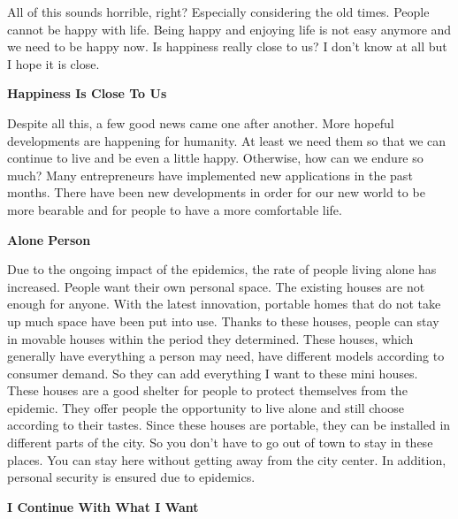 \documentclass[]{book}
\begin{document}
All of this sounds horrible, right? Especially considering the old times. People cannot be happy with life. Being happy and enjoying life is not easy anymore and we need to be happy now. Is happiness really close to us? I don't know at all but I hope it is close.

\textbf{Happiness Is Close To Us}

Despite all this, a few good news came one after another. More hopeful developments are happening for humanity. At least we need them so that we can continue to live and be even a little happy. Otherwise, how can we endure so much? Many entrepreneurs have implemented new applications in the past months. There have been new developments in order for our new world to be more bearable and for people to have a more comfortable life.

\textbf{Alone Person}

Due to the ongoing impact of the epidemics, the rate of people living alone has increased. People want their own personal space. The existing houses are not enough for anyone. With the latest innovation, portable homes that do not take up much space have been put into use. Thanks to these houses, people can stay in movable houses within the period they determined. These houses, which generally have everything a person may need, have different models according to consumer demand. So they can add everything I want to these mini houses. These houses are a good shelter for people to protect themselves from the epidemic. They offer people the opportunity to live alone and still choose according to their tastes. Since these houses are portable, they can be installed in different parts of the city. So you don't have to go out of town to stay in these places. You can stay here without getting away from the city center. In addition, personal security is ensured due to epidemics.

\textbf{I Continue With What I Want}
\end{document}
